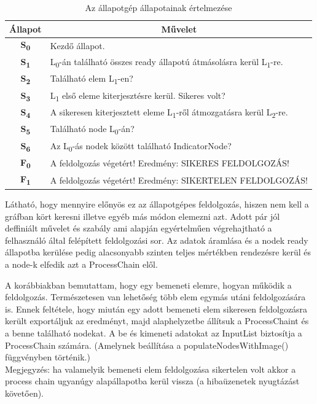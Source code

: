 \documentclass[a4paper,12pt,oneside]{report}
\begin{document}
\begin{table}[h]
\begin{tabular}{p{1cm}|p{12cm}}

\toprule
\multicolumn{1}{c|}{\textbf{Állapot}} & \multicolumn{1}{|c}{\textbf{Művelet}} \\ \midrule
\multicolumn{1}{c|}{\textbf{S\textsubscript{0}}}  & Kezdő állapot. \\
\hline
\multicolumn{1}{c|}{\textbf{S\textsubscript{1}}}  &  L\textsubscript{0}-án található összes ready állapotú átmásolásra kerül L\textsubscript{1}-re.\\
\hline
\multicolumn{1}{c|}{\textbf{S\textsubscript{2}}}  & Található elem L\textsubscript{1}-en? \\
\hline
\multicolumn{1}{c|}{\textbf{S\textsubscript{3}}}  & L\textsubscript{1} első eleme kiterjesztésre kerül. Sikeres volt?  \\
\hline
\multicolumn{1}{c|}{\textbf{S\textsubscript{4}}}  & A sikeresen kiterjesztett eleme L\textsubscript{1}-ről átmozgatásra kerül L\textsubscript{2}-re.  \\
\hline
\multicolumn{1}{c|}{\textbf{S\textsubscript{5}}}  & Található node L\textsubscript{0}-án? \\
\hline
\multicolumn{1}{c|}{\textbf{S\textsubscript{6}}} & Az L\textsubscript{0}-ás nodek között található IndicatorNode? \\
\hline
\multicolumn{1}{c|}{\textbf{F\textsubscript{0}}} &  A feldolgozás végetért! Eredmény: SIKERES FELDOLGOZÁS!\\
\hline
\multicolumn{1}{c|}{\textbf{F\textsubscript{1}}} & A feldolgozás végetért! Eredmény: SIKERTELEN FELDOLGOZÁS! \\
\hline
\end{tabular}
\caption{Az állapotgép állapotainak értelmezése }
\label{table:nonfunct_req_table}
\end{table}

Látható, hogy mennyire előnyös ez az állapotgépes feldolgozás, hiszen nem kell a gráfban kört keresni illetve egyéb más módon elemezni azt. Adott pár jól deffiniált művelet és szabály ami alapján egyértelműen végrehajtható a felhasználó által felépített feldolgozási sor. Az adatok áramlása és a nodek ready állapotba kerülése pedig alacsonyabb szinten teljes mértékben rendezésre kerül és a node-k elfedik azt a ProcessChain elől.

A korábbiakban bemutattam, hogy egy bemeneti elemre, hogyan működik a feldolgozás. Természetesen van lehetőség több elem egymás utáni feldolgozására is. Ennek feltétele, hogy miután egy adott bemeneti elem sikeresen feldolgozásra került exportáljuk az eredményt, majd alaphelyzetbe állítsuk a ProcessChaint és a benne található nodekat. A be és kimeneti adatokat az InputList biztosítja a ProcessChain számára. (Amelynek beállítása a populateNodesWithImage() függvényben történik.)\\
Megjegyzés: ha valamelyik bemeneti elem feldolgozása sikertelen volt akkor a process chain ugyanúgy alapállapotba kerül vissza (a hibaüzenetek nyugtázást követően).
\end{document}
